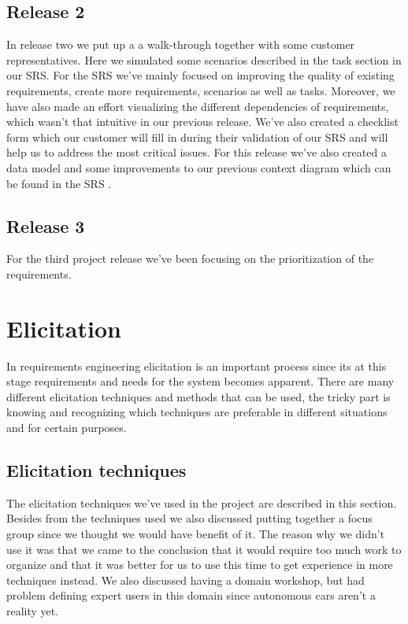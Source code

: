\documentclass[10pt]{article}
\begin{document}
\subsection{Release 2}
In release two we put up a a walk-through together with some customer representatives. Here we simulated some scenarios described in the task section in our SRS. For the SRS we've mainly focused on improving the quality of existing requirements, create more requirements, scenarios as well as tasks. Moreover, we have also made an effort visualizing the different dependencies of requirements, which wasn't that intuitive in our previous release. We've also created a checklist form which our customer will fill in during their validation of our SRS and will help us to address the most critical issues.
For this release we've also created a data model and some improvements to our previous context diagram which can be found in the SRS \cite{srs}.

\subsection{Release 3}
For the third project release we've been focusing on the prioritization of the requirements.

\section{Elicitation}
\sloppy
\noindent
{}
In requirements engineering elicitation is an important process since its at this stage requirements and needs for the system becomes apparent. There are many different elicitation techniques and methods that can be used, the tricky part is knowing and recognizing which techniques are preferable in different situations and for certain purposes.

\subsection{Elicitation techniques}
The elicitation techniques we've used in the project are described in this section. Besides from the techniques used we also discussed putting together a focus group since we thought we would have benefit of it. The reason why we didn't use it was that we came to the conclusion that it would require too much work to organize and that it was better for us to use this time to get experience in more techniques instead. We also discussed having a domain workshop, but had problem defining expert users in this domain since autonomous cars aren't a reality yet.
\end{document}
